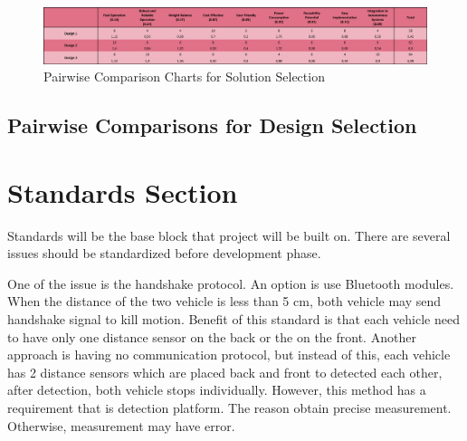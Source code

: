 \documentclass[a4paper,12pt]{article}
\begin{document}
	
	
	\begin{figure}[H]
		\centering
		\includegraphics[width=\textwidth,center]{images/soln_selection} 
		\caption{\label{fig:soln_selection}Pairwise Comparison Charts for Solution Selection}
	\end{figure}
	
	
	
	\subsection{Pairwise Comparisons for Design Selection}	
	
	
	
	





	

\section{Standards Section}
Standards will be the base block that project will be built on. There are several issues should be standardized before development phase. 

One of the issue is the handshake protocol. An option is use Bluetooth modules. When the distance of the two vehicle is less than 5 cm, both vehicle may send handshake signal to kill motion. Benefit of this standard is that each vehicle need to have only one distance sensor on the back or the on the front. Another approach is having no communication protocol, but instead of this, each vehicle has 2 distance sensors which are placed back and front to detected each other, after detection, both vehicle stops individually. However, this method has a requirement that is detection platform. The reason obtain precise measurement. Otherwise, measurement may have error.  
\end{document}
